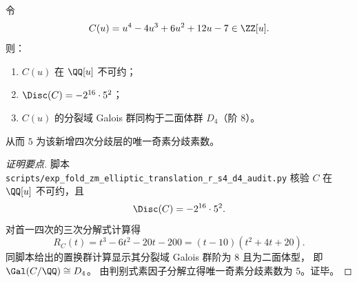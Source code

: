 \begin{proposition}\label{prop:xi-terminal-zm-translation-q0-new-quartic-d4-prime5}
令
\[
C(u)=u^4-4u^3+6u^2+12u-7\in\ZZ[u].
\]
则：
\begin{enumerate}
  \item \(C(u)\) 在 \(\QQ[u]\) 不可约；
  \item \(\Disc(C)=-2^{16}\cdot 5^2\)；
  \item \(C(u)\) 的分裂域 Galois 群同构于二面体群 \(D_4\)（阶 \(8\)）。
\end{enumerate}
从而 \(5\) 为该新增四次分歧层的唯一奇素分歧素数。
\end{proposition}
\begin{proof}[证明要点]
脚本 \texttt{scripts/exp\_fold\_zm\_elliptic\_translation\_r\_s4\_d4\_audit.py}
核验 \(C\) 在 \(\QQ[u]\) 不可约，且
\[
\Disc(C)=-2^{16}\cdot 5^2.
\]
对首一四次的三次分解式计算得
\[
R_C(t)=t^3-6t^2-20t-200=(t-10)(t^2+4t+20).
\]
同脚本给出的置换群计算显示其分裂域 Galois 群阶为 \(8\) 且为二面体型，
即 \(\Gal(C/\QQ)\cong D_4\)。
由判别式素因子分解立得唯一奇素分歧素数为 \(5\)。证毕。
\end{proof}

